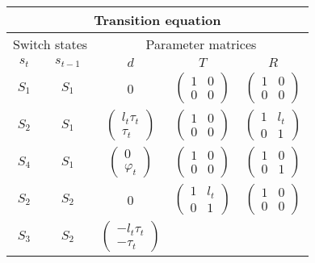 \documentclass[11pt]{article}
\begin{document}
\begin{table}[h!]
\centering
\begin{tabular}[h!]{cc|ccc}
  \hline\hline
  \multicolumn{5}{c}{Transition equation}\\
  \hline
  \multicolumn{2}{c|}{Switch states} & \multicolumn{3}{c}{Parameter
                                      matrices}\\
  $s_{t}$ & $s_{t-1}$ & $d$ & $T$ & $R$ \\
  \hline
  $S_1$ &  $S_1$ & 0 & $\begin{pmatrix}1&0\\0&0\end{pmatrix}$ 
                 & $\begin{pmatrix}1&0\\0&0\end{pmatrix}$\\
  $S_2$ & $S_1$ & $\begin{pmatrix} l_t\tau_t\\ \tau_t\end{pmatrix}$ 
                                    & $\begin{pmatrix} 1 & 0 \\ 0 &
                                      0 \end{pmatrix}$ 
          & $\begin{pmatrix} 1 & l_t\\ 0 & 1 \end{pmatrix}$\\
  $S_4$ & $S_1$ & $\begin{pmatrix}0\\\varphi_t\end{pmatrix}$ 
                                     & $\begin{pmatrix}1&0\\0&0\end{pmatrix}$
          & $\begin{pmatrix}1&0\\0&1\end{pmatrix}$\\
  $S_2$ & $S_2$ & 0 & $\begin{pmatrix} 1 & l_t \\ 0 & 1 \end{pmatrix}$ 
        & $\begin{pmatrix}1&0\\0&0\end{pmatrix}$\\
  $S_3$ & $S_2$ & $\begin{pmatrix} -l_t\tau_t\\ -\tau_t\end{pmatrix}$ 

\end{tabular}
\end{table}
\end{document}
